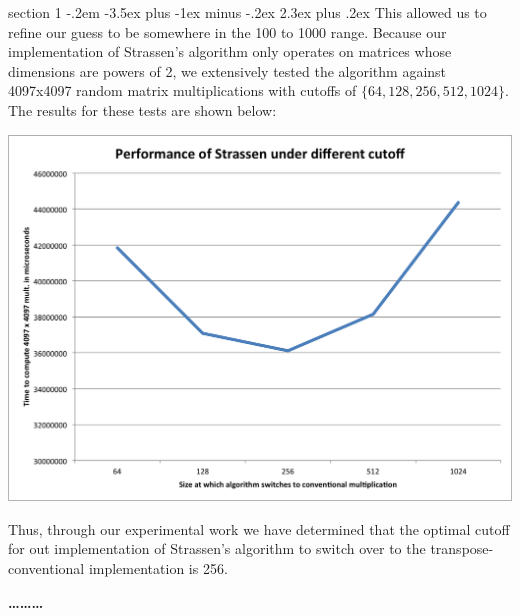 \documentclass[12pt]{article}
\makeatletter
\newenvironment{problem}{\@startsection
       {section}
       {1}
       {-.2em}
       {-3.5ex plus -1ex minus -.2ex}
       {2.3ex plus .2ex}
       {\pagebreak[3]%
       \large\bf\noindent{Problem }
       }
       }
       {%
       \begin{center}\large\bf \ldots\ldots\ldots\end{center}}
\makeatother
\begin{document}
\begin{problem}{}
This allowed us to refine our guess to be somewhere in the 100 to 1000 range.  Because our implementation of Strassen's algorithm only operates on matrices whose dimensions are powers of 2, we extensively tested the algorithm against 4097x4097 random matrix multiplications with cutoffs of $\{64, 128, 256, 512, 1024\}$.  The results for these tests are shown below:
\begin{center}
\includegraphics[scale=0.75]{figs/benchmark-2.png}
\end{center}

Thus, through our experimental work we have determined that the optimal cutoff for out implementation of Strassen's algorithm to switch over to the transpose-conventional implementation is 256.
\end{problem}{}
\end{document}

